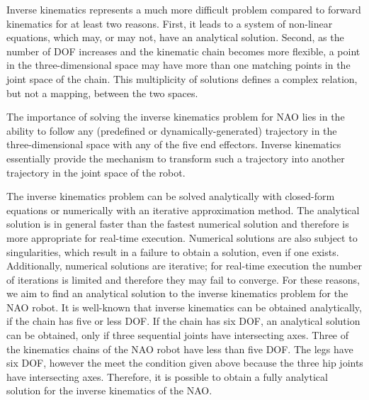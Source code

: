 Inverse kinematics represents a much more difficult problem compared to forward kinematics for at least two reasons. First, it leads to a system of non-linear equations, which may, or may not, have an analytical solution. Second, as the number of DOF increases and the kinematic chain becomes more flexible, a point in the three-dimensional space may have more than one matching points in the joint space of the chain. This multiplicity of solutions defines a complex relation, but not a mapping, between the two spaces.

The importance of solving the inverse kinematics problem for NAO lies in the ability to follow any (predefined or dynamically-generated) trajectory in the three-dimensional space with any of the five end effectors. Inverse kinematics essentially provide the mechanism to transform such a trajectory into another trajectory in the joint space of the robot. 

The inverse kinematics problem can be solved analytically with closed-form equations or numerically with an iterative approximation method. The analytical solution is in general faster than the fastest numerical solution and therefore is more appropriate for real-time execution. Numerical solutions are also subject to singularities, which result in a failure to obtain a solution, even if one exists. Additionally, numerical solutions are iterative; for real-time execution the number of iterations is limited and therefore they may fail to converge. For these reasons, we aim to find an analytical solution to the inverse kinematics problem for the NAO robot. It is well-known that inverse kinematics can be obtained analytically, if the chain has five or less DOF. If the chain has six DOF, an analytical solution can be obtained, only if three sequential joints have intersecting axes. Three of the kinematics chains of the NAO robot have less than five DOF. The legs have six DOF, however the meet the condition given above because the three hip joints have intersecting axes. Therefore, it is possible to obtain a fully analytical solution for the inverse kinematics of the NAO. 


